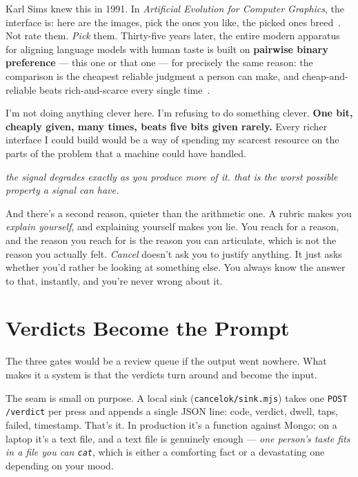 \documentclass[10pt,letterpaper,twocolumn]{article}
\newcommand{\pull}[1]{%
  \par\vspace{0.4em}
  {\aclight\small\color{acpink}\itshape #1}\par
  \vspace{0.4em}}
\begin{document}
Karl Sims knew this in 1991. In \emph{Artificial Evolution for Computer Graphics}, the interface is: here are the images, pick the ones you like, the picked ones breed~\citep{sims1991}. Not rate them. \emph{Pick} them. Thirty-five years later, the entire modern apparatus for aligning language models with human taste is built on \textbf{pairwise binary preference} --- this one or that one --- for precisely the same reason: the comparison is the cheapest reliable judgment a person can make, and cheap-and-reliable beats rich-and-scarce every single time~\citep{christiano2017}.

I'm not doing anything clever here. I'm refusing to do something clever. \textbf{One bit, cheaply given, many times, beats five bits given rarely.} Every richer interface I could build would be a way of spending my scarcest resource on the parts of the problem that a machine could have handled.

\pull{the signal degrades exactly as you produce more of it. that is the worst possible property a signal can have.}

And there's a second reason, quieter than the arithmetic one. A rubric makes you \emph{explain yourself}, and explaining yourself makes you lie. You reach for a reason, and the reason you reach for is the reason you can articulate, which is not the reason you actually felt. \emph{Cancel} doesn't ask you to justify anything. It just asks whether you'd rather be looking at something else. You always know the answer to that, instantly, and you're never wrong about it.


\section{Verdicts Become the Prompt}

The three gates would be a review queue if the output went nowhere. What makes it a system is that the verdicts turn around and become the input.

The seam is small on purpose. A local sink (\texttt{cancelok/sink.mjs}) takes one \texttt{POST /verdict} per press and appends a single JSON line: code, verdict, dwell, taps, failed, timestamp. That's it. In production it's a function against Mongo; on a laptop it's a text file, and a text file is genuinely enough --- \emph{one person's taste fits in a file you can \texttt{cat}}, which is either a comforting fact or a devastating one depending on your mood.
\end{document}
